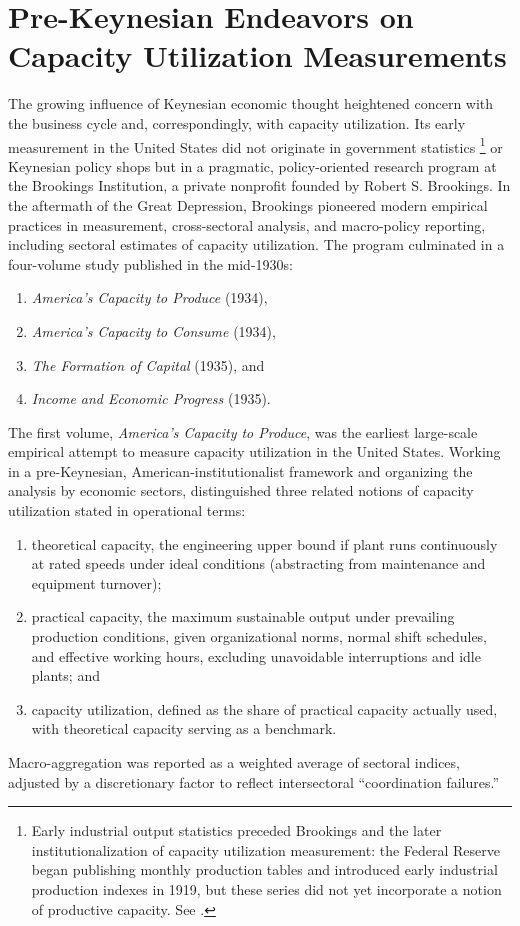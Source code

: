 \documentclass[11pt]{article}
\begin{document}
\section{Pre-Keynesian Endeavors on Capacity Utilization Measurements}

The growing influence of Keynesian economic thought heightened concern with the business cycle and, correspondingly, with capacity utilization. Its early measurement in the United States did not originate in government statistics \footnote{Early industrial output statistics preceded Brookings and the later institutionalization of capacity utilization measurement: the Federal Reserve began publishing monthly production tables and introduced early industrial production indexes in 1919, but these series did not yet incorporate a notion of productive capacity. See \citep{bogfrs2017}.} or Keynesian policy shops but in a pragmatic, policy-oriented research program at the Brookings Institution, a private nonprofit founded by Robert S. Brookings. In the aftermath of the Great Depression, Brookings pioneered modern empirical practices in measurement, cross-sectoral analysis, and macro-policy reporting, including sectoral estimates of capacity utilization. The program culminated in a four-volume study published in the mid-1930s:
\begin{enumerate}
\renewcommand{\labelenumi}{\roman{enumi})}
\item \emph{America's Capacity to Produce} (1934),
\item \emph{America's Capacity to Consume} (1934),
\item \emph{The Formation of Capital} (1935), and
\item \emph{Income and Economic Progress} (1935).
\end{enumerate}

The first volume, \emph{America's Capacity to Produce}, was the earliest large-scale empirical attempt to measure capacity utilization in the United States. Working in a pre-Keynesian, American-institutionalist framework and organizing the analysis by economic sectors, \citet{nourseetal1934} distinguished three related notions of capacity utilization stated in operational terms:

\begin{enumerate}
\renewcommand{\labelenumi}{\roman{enumi})}
\item theoretical capacity, the engineering upper bound if plant runs continuously at rated speeds under ideal conditions (abstracting from maintenance and equipment turnover);
\item practical capacity, the maximum sustainable output under prevailing production conditions, given organizational norms, normal shift schedules, and effective working hours, excluding unavoidable interruptions and idle plants; and
\item capacity utilization, defined as the share of practical capacity actually used, with theoretical capacity serving as a benchmark.
\end{enumerate}
Macro-aggregation was reported as a weighted average of sectoral indices, adjusted by a discretionary factor to reflect intersectoral ``coordination failures.''
\end{document}
